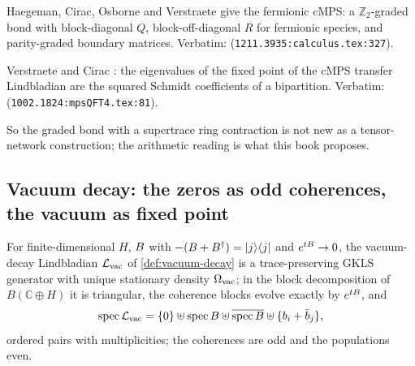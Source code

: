 \begin{citedfact}
\label{cit:fcmps-graded-bond}
Haegeman, Cirac, Osborne and Verstraete \cite{haegeman2013calculus} give the fermionic
cMPS: a $\mathbb Z_2$-graded bond with block-diagonal $Q$, block-off-diagonal $R$ for
fermionic species, and parity-graded boundary matrices.
Verbatim: \texttt{} (\texttt{1211.3935:calculus.tex:327}).
\end{citedfact}

\begin{citedfact}
\label{cit:cmps-schmidt-fixed-point}
Verstraete and Cirac \cite{verstraete2010cmps}: the eigenvalues of the fixed point of the
cMPS transfer Lindbladian are the squared Schmidt coefficients of a bipartition.
Verbatim: \texttt{} (\texttt{1002.1824:mpsQFT4.tex:81}).
\end{citedfact}

So the graded bond with a supertrace ring contraction is not new as a tensor-network
construction; the arithmetic reading is what this book proposes.

\subsection{Vacuum decay: the zeros as odd coherences, the vacuum as fixed point}

\begin{theorem}
\label{thm:vacuum-decay-finite}
For finite-dimensional $H$, $B$ with $-(B+B^\dagger) = |j\rangle\langle j|$
and $e^{tB}\to0$, the vacuum-decay Lindbladian $\mathcal L_{\mathrm{vac}}$ of \cref{def:vacuum-decay}
is a trace-preserving GKLS generator with unique stationary density $\Omega_{\mathrm{vac}}$; in the block
decomposition of $B(\mathbb C\oplus H)$ it is triangular, the coherence blocks evolve
exactly by $e^{tB}$, and
\[
  \operatorname{spec}\mathcal L_{\mathrm{vac}} = \{0\}\uplus\operatorname{spec}B\uplus
  \overline{\operatorname{spec}B}\uplus\{b_i+\bar b_j\},
\]
ordered pairs with multiplicities; the coherences are odd and the populations even.
\end{theorem}

